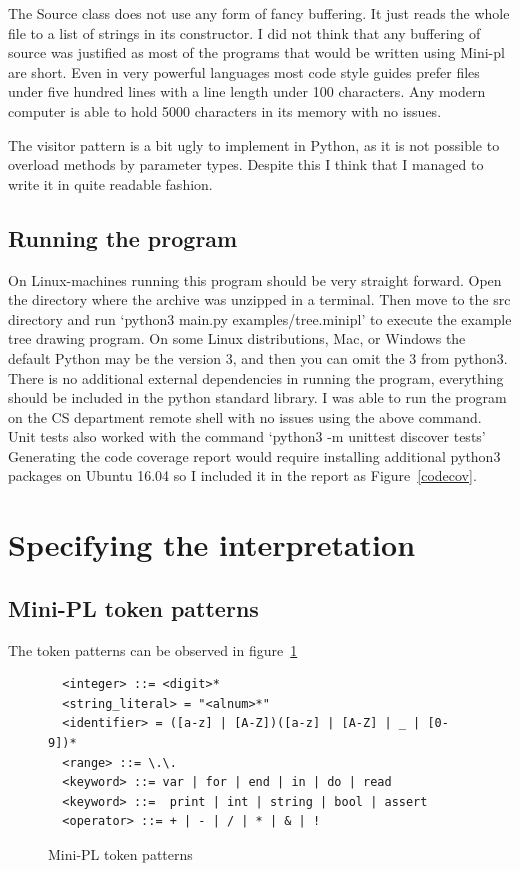 \documentclass[12pt,a4paper]{article}
\begin{document}
The Source class does not use any form of fancy buffering. It just reads
the whole file to a list of strings in its constructor. I did not think
that any buffering of source was justified as most of the programs 
that would be written using Mini-pl are short. Even in very powerful
languages most code style guides prefer files under five hundred lines with
a line length under 100 characters. Any modern computer is able to hold
5000 characters in its memory with no issues.

The visitor pattern is a bit ugly to implement in Python,
as it is not possible to overload methods by parameter types.
Despite this I think that I managed to write it in quite
readable fashion.

\subsection{Running the program}

On Linux-machines running this program should be very straight forward.
Open the directory where the archive was unzipped in a terminal.
Then move to the src directory and run
`python3 main.py  examples/tree.minipl'
to execute the example tree drawing program.
On some Linux distributions, Mac, or Windows the default Python may be the version 3,
and then you can omit the 3 from python3.
There is no additional external dependencies in running the program,
everything should be included in the python standard library.
I was able to run the program on the CS department remote shell
with no issues using the above command. Unit tests also worked
with the command `python3 -m unittest discover tests'
Generating the code coverage report would require installing 
additional python3 packages on Ubuntu 16.04 so I included it in the 
report as Figure~\ref{codecov}.


\section{Specifying the interpretation}

\subsection{Mini-PL token patterns}
The token patterns can be observed in figure~\ref{token_patterns}
\begin{figure}\label{token_patterns}
  \caption{Mini-PL token patterns}
  \begin{verbatim}
  <integer> ::= <digit>*
  <string_literal> = "<alnum>*"
  <identifier> = ([a-z] | [A-Z])([a-z] | [A-Z] | _ | [0-9])*
  <range> ::= \.\.
  <keyword> ::= var | for | end | in | do | read 
  <keyword> ::=  print | int | string | bool | assert
  <operator> ::= + | - | / | * | & | !
  \end{verbatim}
\end{figure}
\end{document}
